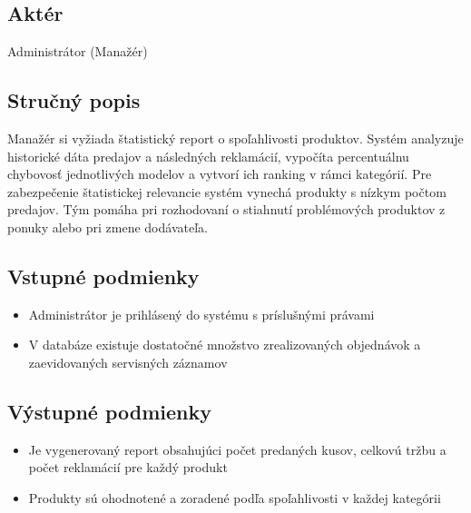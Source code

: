 \documentclass[11pt, a4paper]{article}
\begin{document}
\subsection*{Aktér}
Administrátor (Manažér)

\subsection*{Stručný popis}
Manažér si vyžiada štatistický report o spoľahlivosti produktov. Systém analyzuje historické dáta predajov a následných reklamácií, vypočíta percentuálnu chybovosť jednotlivých modelov a vytvorí ich ranking v rámci kategórií. Pre zabezpečenie štatistickej relevancie systém vynechá produkty s nízkym počtom predajov. Tým pomáha pri rozhodovaní o stiahnutí problémových produktov z ponuky alebo pri zmene dodávateľa.

\subsection*{Vstupné podmienky}
\begin{itemize}
    \item Administrátor je prihlásený do systému s príslušnými právami
    \item V databáze existuje dostatočné množstvo zrealizovaných objednávok a zaevidovaných servisných záznamov
\end{itemize}

\subsection*{Výstupné podmienky}
\begin{itemize}
    \item Je vygenerovaný report obsahujúci počet predaných kusov, celkovú tržbu a počet reklamácií pre každý produkt
    \item Produkty sú ohodnotené a zoradené podľa spoľahlivosti v každej kategórii
\end{itemize}
\end{document}
